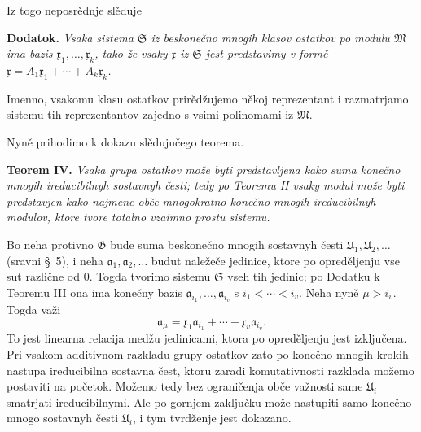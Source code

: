 \documentclass[11pt]{article}
\providecommand{\mM}{\mathfrak M}
\providecommand{\mG}{\mathfrak G}
\providecommand{\mS}{\mathfrak S}
\providecommand{\mU}{\mathfrak U}
\providecommand{\ma}{\mathfrak a}
\providecommand{\mx}{\mathfrak x}
\begin{document}
Iz togo neposrědnje slěduje

\textbf{Dodatok.} \textit{Vsaka sistema \(\mS\) iz beskonečno mnogih klasov ostatkov po modulu \(\mM\) ima bazis \(\mx_1,\ldots,\mx_k\), tako že vsaky \(\mx\) iz \(\mS\) jest predstavimy v formě \(\mx=A_1\mx_1+\cdots+A_k\mx_k\).}

Imenno, vsakomu klasu ostatkov prirědžujemo někoj reprezentant i razmatrjamo sistemu tih reprezentantov zajedno s vsimi polinomami iz \(\mM\).

Nyně prihodimo k dokazu slědujučego teorema.

\textbf{Teorem IV.} \textit{Vsaka grupa ostatkov može byti predstavljena kako suma konečno mnogih ireducibilnyh sostavnyh česti; tedy po Teoremu II vsaky modul može byti predstavjen kako najmene obče mnogokratno konečno mnogih ireducibilnyh modulov, ktore tvore totalno vzaimno prostu sistemu.}

Bo neha protivno \(\mG\) bude suma beskonečno mnogih sostavnyh česti \(\mU_1,\mU_2,\ldots\) (sravni \S~5), i neha \(\ma_1,\ma_2,\ldots\) budut naležeče jedinice, ktore po opreděljenju vse sut različne od \(0\). Togda tvorimo sistemu \(\mS\) vseh tih jedinic; po Dodatku k Teoremu III ona ima konečny bazis \(\ma_{i_1},\ldots,\ma_{i_v}\) s \(i_1<\cdots<i_v\). Neha nyně \(\mu>i_v\). Togda važi
\[
 \ma_\mu=\mx_1\ma_{i_1}+\cdots+\mx_v\ma_{i_v}.
\]
To jest linearna relacija medžu jedinicami, ktora po opreděljenju jest izključena. Pri vsakom additivnom razkladu grupy ostatkov zato po konečno mnogih krokih nastupa ireducibilna sostavna čest, ktoru zaradi komutativnosti razklada možemo postaviti na početok. Možemo tedy bez ograničenja obče važnosti same \(\mU_i\) smatrjati ireducibilnymi. Ale po gornjem zaključku može nastupiti samo konečno mnogo sostavnyh česti \(\mU_i\), i tym tvrdženje jest dokazano.
\end{document}
